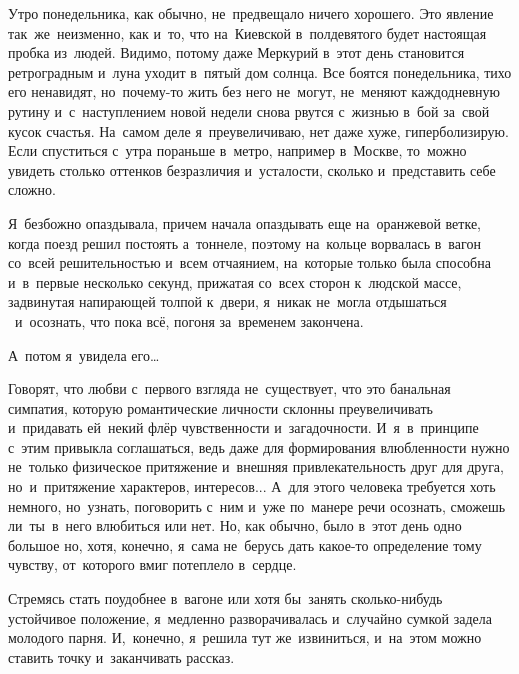 
\lettrine[lines=3, loversize=0.1]{У}{}тро понедельника, как обычно, не~предвещало ничего хорошего.
Это явление так~же~неизменно, как и~то, что на~Киевской в~полдевятого будет настоящая пробка из~людей.
Видимо, потому даже Меркурий в~этот день становится ретроградным и~луна уходит в~пятый дом солнца.
Все боятся понедельника, тихо его ненавидят, но~почему-то жить без него не~могут, не~меняют каждодневную рутину и~с~наступлением новой недели снова рвутся с~жизнью в~бой за~свой кусок счастья.
На~самом деле я~преувеличиваю, нет даже хуже, гиперболизирую.
Если спуститься с~утра пораньше в~метро, например в~Москве, то~можно увидеть столько оттенков безразличия и~усталости, сколько и~представить себе сложно.

Я~безбожно опаздывала, причем начала опаздывать еще на~оранжевой ветке, когда поезд решил постоять а~тоннеле, поэтому на~кольце ворвалась в~вагон со~всей решительностью и~всем отчаянием, на~которые только была способна и~в~первые несколько секунд, прижатая со~всех сторон к~людской массе, задвинутая напирающей толпой к~двери, я~никак не~могла отдышаться ~и~осознать, что пока всё, погоня за~временем закончена.


А~потом я~увидела его…
 
Говорят, что любви с~первого взгляда не~существует, что это банальная симпатия, которую романтические личности склонны преувеличивать и~придавать ей~некий флёр чувственности и~загадочности.
И~я~в~принципе с~этим привыкла соглашаться, ведь даже для формирования влюбленности нужно не~только физическое притяжение и~внешняя привлекательность друг для друга, но~и~притяжение характеров, интересов...
А~для этого человека требуется хоть немного, но~узнать, поговорить с~ним и~уже по~манере речи осознать, сможешь ли~ты~в~него влюбиться или нет.
Но, как обычно, было в~этот день одно большое но, хотя, конечно, я~сама не~берусь дать какое-то определение тому чувству, от~которого вмиг потеплело в~сердце.
 
Стремясь стать поудобнее в~вагоне или хотя бы~занять сколько-нибудь устойчивое положение, я~медленно разворачивалась и~случайно сумкой задела молодого парня.
И,~конечно, я~решила тут же~извиниться, и~на~этом можно ставить точку и~заканчивать рассказ.
 

